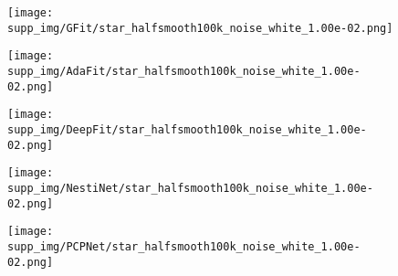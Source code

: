 \documentclass[runningheads]{llncs}
\begin{document}
\begin{figure*}
\begin{subfigure}{0.15\linewidth}
		\centering
		\texttt{[image: supp\_img/GFit/star\_halfsmooth100k\_noise\_white\_1.00e-02.png]}
\end{subfigure}
	\hspace{0.1cm}
	\begin{subfigure}{0.15\linewidth}
		\centering
		\texttt{[image: supp\_img/AdaFit/star\_halfsmooth100k\_noise\_white\_1.00e-02.png]}
\end{subfigure}
	\hspace{0.1cm}
	\begin{subfigure}{0.17\linewidth}
		\centering
		\texttt{[image: supp\_img/DeepFit/star\_halfsmooth100k\_noise\_white\_1.00e-02.png]}
\end{subfigure}
	\hspace{0.1cm}
	\begin{subfigure}{0.17\linewidth}
		\centering
		\texttt{[image: supp\_img/NestiNet/star\_halfsmooth100k\_noise\_white\_1.00e-02.png]}
\end{subfigure}
	\hspace{0.1cm}
	\begin{subfigure}{0.17\linewidth}
		\centering
		\texttt{[image: supp\_img/PCPNet/star\_halfsmooth100k\_noise\_white\_1.00e-02.png]}
\end{subfigure}
	

\end{figure*}
\end{document}
